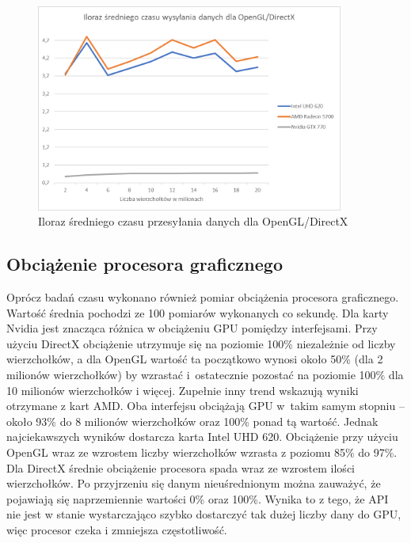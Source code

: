 \documentclass[archive]{mgr}
\begin{document}
\begin{figure}[h!]
  \centering
    \includegraphics[width=0.9\textwidth]{images/data/4.png}
   \caption{Iloraz średniego czasu przesyłania danych dla OpenGL/DirectX}
   \label{lab:64}
\end{figure}

\subsection{Obciążenie procesora graficznego}

Oprócz badań czasu wykonano również pomiar obciążenia procesora graficznego. 
Wartość średnia pochodzi ze 100 pomiarów wykonanych co sekundę. Dla karty Nvidia jest znacząca różnica w obciążeniu GPU pomiędzy interfejsami. Przy użyciu DirectX obciążenie utrzymuje się na poziomie 100\% niezależnie od liczby wierzchołków, a dla OpenGL wartość ta początkowo wynosi około 50\% (dla 2 milionów wierzchołków) by wzrastać i~ostatecznie pozostać na poziomie 100\% dla 10 milionów wierzchołków i więcej. Zupełnie inny trend wskazują wyniki otrzymane z kart AMD. Oba interfejsu obciążają GPU w~takim samym stopniu – około 93\% do 8 milionów wierzchołków oraz 100\% ponad tą wartość. Jednak najciekawszych wyników dostarcza karta Intel UHD 620. Obciążenie przy użyciu OpenGL wraz ze wzrostem liczby wierzchołków wzrasta z poziomu 85\% do 97\%.  Dla DirectX średnie obciążenie procesora spada wraz ze wzrostem ilości wierzchołków. Po przyjrzeniu się danym nieuśrednionym można zauważyć, że pojawiają się naprzemiennie wartości 0\% oraz 100\%. Wynika to z tego, że API nie jest w stanie wystarczająco szybko dostarczyć tak dużej liczby dany do GPU, więc procesor czeka i zmniejsza częstotliwość.
\end{document}
